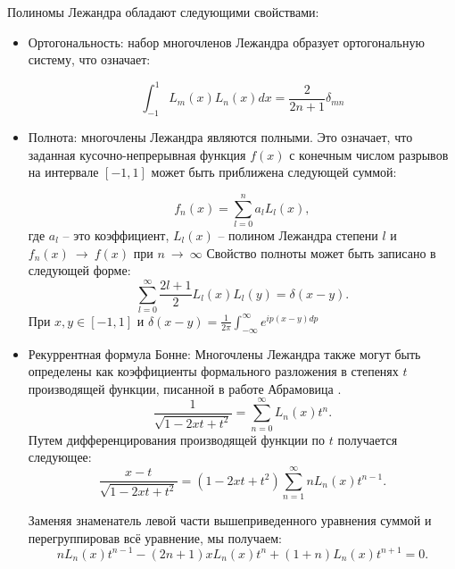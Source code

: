 %
Полиномы Лежандра обладают следующими свойствами:
\begin{itemize}
    \item Ортогональность: набор многочленов Лежандра образует ортогональную систему, что означает:

    \begin{equation*}
        \int_{-1}^{1} L_m(x)L_n(x)dx = \frac{2}{2n+1}\delta_{mn}
    \end{equation*}
        
    \item Полнота: многочлены Лежандра являются полными. Это означает, что заданная кусочно-непрерывная функция $f(x)$ с конечным числом разрывов на интервале $[-1,1]$ может быть приближена следующей суммой:

    \begin{equation*}
        f_n(x) = \sum_{l=0}^{n} a_l L_l(x),
    \end{equation*}
    где $a_l$ -- это коэффициент, $L_l(x)$ -- полином Лежандра степени $l$ и $f_n(x)~\rightarrow~f(x)$ при $n~\rightarrow~\infty$
    Свойство полноты может быть записано в следующей форме:
    \begin{equation*}
        \sum_{l=0}^{\infty} \frac{2l+1}{2} L_l(x)L_l(y) = \delta(x-y).
    \end{equation*}
    При $x,y \in [-1,1]$ и $\delta(x-y)=\frac{1}{2\pi}\int_{-\infty}^{\infty} e^{ip(x-y)dp}$

    \item Рекуррентная формула Бонне: Многочлены Лежандра также могут быть определены как коэффициенты формального разложения в степенях $t$ производящей функции, 
    писанной в работе Абрамовица \cite{abramowitz1988handbook}.
    \begin{equation*}
        \frac{1}{\sqrt{1-2xt+t^2}} = \sum_{n=0}^{\infty} L_n(x)t^n.
    \end{equation*}
    Путем дифференцирования производящей функции по $t$ получается следующее:
    \begin{equation*}
        \frac{x-t}{\sqrt{1-2xt+t^2}} = (1-2xt+t^2)\sum_{n=1}^{\infty} nL_n(x)t^{n-1}.
    \end{equation*}
    
    Заменяя знаменатель левой части вышеприведенного уравнения суммой и перегруппировав всё уравнение, мы получаем:
    \begin{equation*}
        nL_n(x)t^{n-1}-(2n+1)xL_n(x)t^n+(1+n)L_n(x)t^{n+1}=0.
    \end{equation*}
    

\end{itemize}

